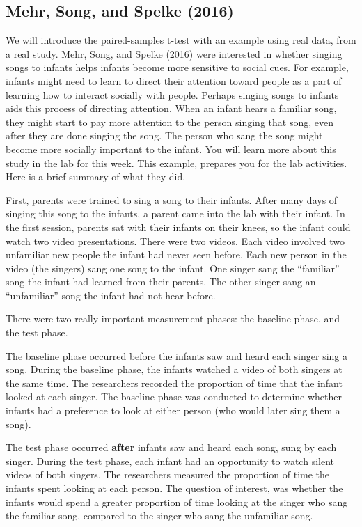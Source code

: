 \documentclass[
  letterpaper,
  DIV=11,
  numbers=noendperiod]{scrreprt}
\begin{document}
\subsection{Mehr, Song, and Spelke
(2016)}\label{mehr-song-and-spelke-2016}

We will introduce the paired-samples t-test with an example using real
data, from a real study. Mehr, Song, and Spelke (2016) were interested
in whether singing songs to infants helps infants become more sensitive
to social cues. For example, infants might need to learn to direct their
attention toward people as a part of learning how to interact socially
with people. Perhaps singing songs to infants aids this process of
directing attention. When an infant hears a familiar song, they might
start to pay more attention to the person singing that song, even after
they are done singing the song. The person who sang the song might
become more socially important to the infant. You will learn more about
this study in the lab for this week. This example, prepares you for the
lab activities. Here is a brief summary of what they did.

First, parents were trained to sing a song to their infants. After many
days of singing this song to the infants, a parent came into the lab
with their infant. In the first session, parents sat with their infants
on their knees, so the infant could watch two video presentations. There
were two videos. Each video involved two unfamiliar new people the
infant had never seen before. Each new person in the video (the singers)
sang one song to the infant. One singer sang the ``familiar'' song the
infant had learned from their parents. The other singer sang an
``unfamiliar'' song the infant had not hear before.

There were two really important measurement phases: the baseline phase,
and the test phase.

The baseline phase occurred before the infants saw and heard each singer
sing a song. During the baseline phase, the infants watched a video of
both singers at the same time. The researchers recorded the proportion
of time that the infant looked at each singer. The baseline phase was
conducted to determine whether infants had a preference to look at
either person (who would later sing them a song).

The test phase occurred \textbf{after} infants saw and heard each song,
sung by each singer. During the test phase, each infant had an
opportunity to watch silent videos of both singers. The researchers
measured the proportion of time the infants spent looking at each
person. The question of interest, was whether the infants would spend a
greater proportion of time looking at the singer who sang the familiar
song, compared to the singer who sang the unfamiliar song.
\end{document}
